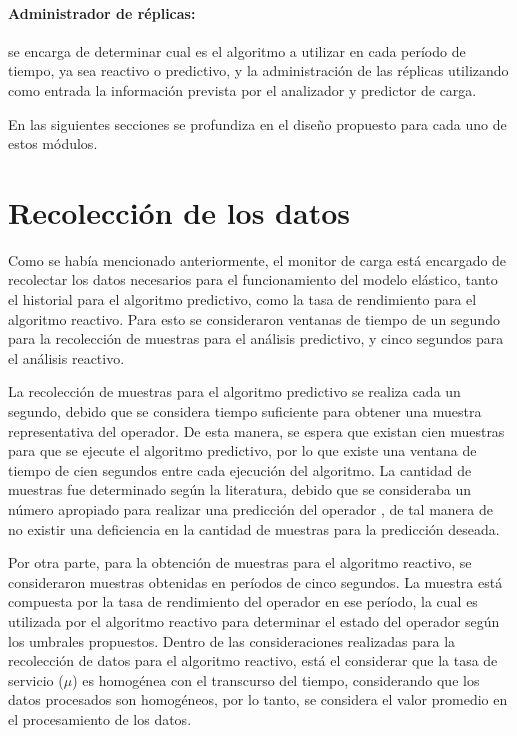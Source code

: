 \paragraph{Administrador de réplicas:} se encarga de determinar cual es el algoritmo a utilizar en cada período de tiempo, ya sea reactivo o predictivo, y la administración de las réplicas utilizando como entrada la información prevista por el analizador y predictor de carga.

En las siguientes secciones se profundiza en el diseño propuesto para cada uno de estos módulos.

\section{Recolección de los datos}

Como se había mencionado anteriormente, el monitor de carga está encargado de recolectar los datos necesarios para el funcionamiento del modelo elástico, tanto el historial para el algoritmo predictivo, como la tasa de rendimiento para el algoritmo reactivo. Para esto se consideraron ventanas de tiempo de un segundo para la recolección de muestras para el análisis predictivo, y cinco segundos para el análisis reactivo.

La recolección de muestras para el algoritmo predictivo se realiza cada un segundo, debido que se considera tiempo suficiente para obtener una muestra representativa del operador. De esta manera, se espera que existan cien muestras para que se ejecute el algoritmo predictivo, por lo que existe una ventana de tiempo de cien segundos entre cada ejecución del algoritmo. La cantidad de muestras fue determinado según la literatura, debido que se consideraba un número apropiado para realizar una predicción del operador \citep{ching2006markov}, de tal manera de no existir una deficiencia en la cantidad de muestras para la predicción deseada.

Por otra parte, para la obtención de muestras para el algoritmo reactivo, se consideraron muestras obtenidas en períodos de cinco segundos. La muestra está compuesta por la tasa de rendimiento del operador en ese período, la cual es utilizada por el algoritmo reactivo para determinar el estado del operador según los umbrales propuestos. Dentro de las consideraciones realizadas para la recolección de datos para el algoritmo reactivo, está el considerar que la tasa de servicio ($\mu$) es homogénea con el transcurso del tiempo, considerando que los datos procesados son homogéneos, por lo tanto, se considera el valor promedio en el procesamiento de los datos. 

